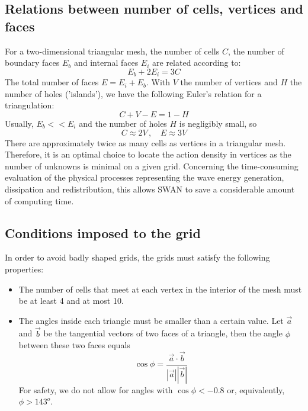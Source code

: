\documentclass[12pt]{book}
\begin{document}
\subsection{Relations between number of cells, vertices and faces}

For a two-dimensional triangular mesh, the number of cells $C$, the number of boundary faces $E_b$ and internal faces $E_i$ are related according to:
\begin{equation}
  E_b + 2 E_i = 3C
\end{equation}
The total number of faces $E = E_i + E_b$. With $V$ the number of vertices and $H$ the number of holes ('islands'), we have the following Euler's relation
for a triangulation:
\begin{equation}
  C + V  - E = 1 - H
\end{equation}
Usually, $E_b << E_i$ and the number of holes $H$ is negligibly small, so
\begin{equation}
  C \approx 2V\, , \quad E \approx 3V
\end{equation}
There are approximately twice as many cells as vertices
in a triangular mesh.
Therefore, it is an optimal choice to locate the action density in vertices
as the number of unknowns is minimal on a given grid.
Concerning the
time-consuming evaluation of the physical processes representing the wave energy generation,
dissipation and redistribution, this allows SWAN to save a considerable amount of computing time.

\subsection{Conditions imposed to the grid}

In order to avoid badly shaped grids, the grids must satisfy the following
properties:
\begin{itemize}
  \item The number of cells that meet at each vertex in the interior of the mesh must be at least 4 and at most 10.
  \item The angles inside each triangle must be smaller than a certain value. Let $\vec{a}$ and $\vec{b}$ be the tangential vectors of two faces of a
        triangle, then the angle $\phi$ between these two faces equals
        \begin{equation}
           \cos \phi = \frac{\vec{a} \cdot \vec{b}}{|\vec{a}||\vec{b}|}
        \end{equation}
        For safety, we do not allow for angles with $\cos \phi < -0.8$ or, equivalently, $\phi > 143^o$.
\end{itemize}
\end{document}
